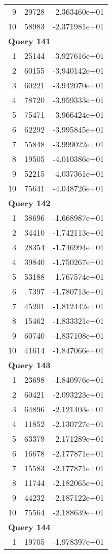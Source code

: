 \begin{longtable}[{p}]{@{}rrp{}@{}}
9 & 29728 & -2.363460e+01 \\
10 & 58983 & -2.371981e+01 \\
\midrule
\multicolumn{3}{l}{\bfseries Query 141} \\
1 & 25144 & -3.927616e+01 \\
2 & 60155 & -3.940142e+01 \\
3 & 60221 & -3.942070e+01 \\
4 & 78720 & -3.959333e+01 \\
5 & 75471 & -3.966424e+01 \\
6 & 62292 & -3.995845e+01 \\
7 & 55848 & -3.999022e+01 \\
8 & 19505 & -4.010386e+01 \\
9 & 52215 & -4.037361e+01 \\
10 & 75641 & -4.048726e+01 \\
\midrule
\multicolumn{3}{l}{\bfseries Query 142} \\
1 & 38696 & -1.668987e+01 \\
2 & 34410 & -1.742113e+01 \\
3 & 28354 & -1.746994e+01 \\
4 & 39840 & -1.750267e+01 \\
5 & 53188 & -1.767574e+01 \\
6 & 7397 & -1.780713e+01 \\
7 & 45201 & -1.812442e+01 \\
8 & 15462 & -1.833321e+01 \\
9 & 60740 & -1.837108e+01 \\
10 & 41614 & -1.847066e+01 \\
\midrule
\multicolumn{3}{l}{\bfseries Query 143} \\
1 & 23698 & -1.840976e+01 \\
2 & 60421 & -2.093223e+01 \\
3 & 64896 & -2.121403e+01 \\
4 & 11852 & -2.130727e+01 \\
5 & 63379 & -2.171289e+01 \\
6 & 16678 & -2.177871e+01 \\
7 & 15583 & -2.177871e+01 \\
8 & 11744 & -2.182065e+01 \\
9 & 44232 & -2.187122e+01 \\
10 & 75564 & -2.188639e+01 \\
\midrule
\multicolumn{3}{l}{\bfseries Query 144} \\
1 & 19705 & -1.978397e+01 \\

\end{longtable}
